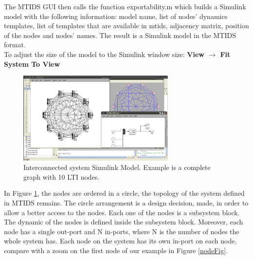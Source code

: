 \documentclass[a4paper,twoside, openright,12pt]{report}
\begin{document}
The MTIDS GUI then calls the function exportability.m which builds a Simulink model with the following information:
model name, list of nodes' dynamics templates, list of templates that are available in mtids, adjacency matrix, position of the nodes and nodes' names. 
The result is a Simulink model in the MTIDS format. \\

To adjust the size of the model to the Simulink window size: \textbf{View $\rightarrow$ Fit System To View}\\
% 

\begin{figure}[htb]
\centering
\includegraphics[width=0.7\textwidth]{pics/screenExportResult.eps}
\caption[MTIDS exported Simulink model]{Interconnected system Simulink Model. Example is a complete graph with 10 LTI nodes. }
\label{exportFig}
\end{figure}

In Figure \ref{exportFig}, the nodes are ordered in a circle, the topology of the system defined in MTIDS remains. The circle arrangement is a 
design decision, made, in order to allow a better access to the nodes. Each one of the nodes is a subsystem block. The dynamic of the nodes is defined inside
the subsystem block. Moreover, each node has a single out-port and N in-ports, where N is the number of nodes the whole system has. Each node on the 
system has its own in-port on each node, compare with a zoom on the first node of our example in Figure \ref{nodeFig}. \\
 
\end{document}
